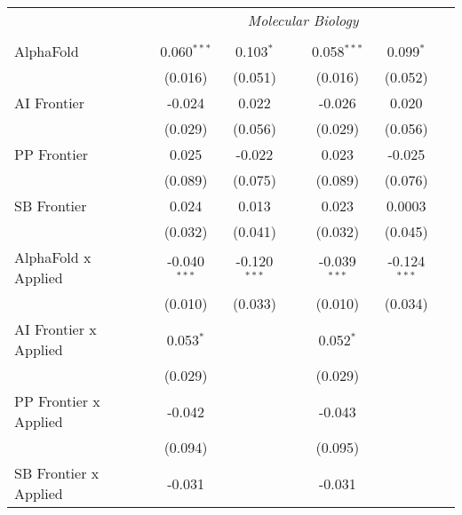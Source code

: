 \begin{tabular}{lcccccc}
 & \multicolumn{6}{c}{\textit{Molecular Biology}} \\ \\
   AlphaFold                    & 0.060$^{***}$  & 0.103$^{*}$    &                & 0.058$^{***}$  & 0.099$^{*}$    &   \\   
                                & (0.016)        & (0.051)        &                & (0.016)        & (0.052)        &   \\   
   AI Frontier                  & -0.024         & 0.022          &                & -0.026         & 0.020          &   \\   
                                & (0.029)        & (0.056)        &                & (0.029)        & (0.056)        &   \\   
   PP Frontier                  & 0.025          & -0.022         &                & 0.023          & -0.025         &   \\   
                                & (0.089)        & (0.075)        &                & (0.089)        & (0.076)        &   \\   
   SB Frontier                  & 0.024          & 0.013          &                & 0.023          & 0.0003         &   \\   
                                & (0.032)        & (0.041)        &                & (0.032)        & (0.045)        &   \\   
   AlphaFold x Applied          & -0.040$^{***}$ & -0.120$^{***}$ &                & -0.039$^{***}$ & -0.124$^{***}$ &   \\   
                                & (0.010)        & (0.033)        &                & (0.010)        & (0.034)        &   \\   
   AI Frontier x Applied        & 0.053$^{*}$    &                &                & 0.052$^{*}$    &                &   \\   
                                & (0.029)        &                &                & (0.029)        &                &   \\   
   PP Frontier x Applied        & -0.042         &                &                & -0.043         &                &   \\   
                                & (0.094)        &                &                & (0.095)        &                &   \\   
   SB Frontier x Applied        & -0.031         &                &                & -0.031         &                &   \\   

\end{tabular}
